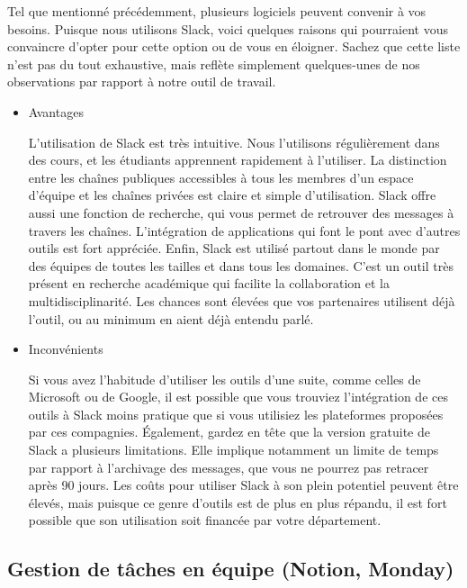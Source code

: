 \documentclass[
  letterpaper,
]{scrbook}
\begin{document}
Tel que mentionné précédemment, plusieurs logiciels peuvent convenir à
vos besoins. Puisque nous utilisons Slack, voici quelques raisons qui
pourraient vous convaincre d'opter pour cette option ou de vous en
éloigner. Sachez que cette liste n'est pas du tout exhaustive, mais
reflète simplement quelques-unes de nos observations par rapport à notre
outil de travail.

\begin{itemize}
\item
  Avantages

  L'utilisation de Slack est très intuitive. Nous l'utilisons
  régulièrement dans des cours, et les étudiants apprennent rapidement à
  l'utiliser. La distinction entre les chaînes publiques accessibles à
  tous les membres d'un espace d'équipe et les chaînes privées est
  claire et simple d'utilisation. Slack offre aussi une fonction de
  recherche, qui vous permet de retrouver des messages à travers les
  chaînes. L'intégration de applications qui font le pont avec d'autres
  outils est fort appréciée. Enfin, Slack est utilisé partout dans le
  monde par des équipes de toutes les tailles et dans tous les domaines.
  C'est un outil très présent en recherche académique qui facilite la
  collaboration et la multidisciplinarité. Les chances sont élevées que
  vos partenaires utilisent déjà l'outil, ou au minimum en aient déjà
  entendu parlé.
\item
  Inconvénients

  Si vous avez l'habitude d'utiliser les outils d'une suite, comme
  celles de Microsoft ou de Google, il est possible que vous trouviez
  l'intégration de ces outils à Slack moins pratique que si vous
  utilisiez les plateformes proposées par ces compagnies. Également,
  gardez en tête que la version gratuite de Slack a plusieurs
  limitations. Elle implique notamment un limite de temps par rapport à
  l'archivage des messages, que vous ne pourrez pas retracer après 90
  jours. Les coûts pour utiliser Slack à son plein potentiel peuvent
  être élevés, mais puisque ce genre d'outils est de plus en plus
  répandu, il est fort possible que son utilisation soit financée par
  votre département.
\end{itemize}

\hypertarget{gestion-de-tuxe2ches-en-uxe9quipe-notion-monday}{%
\subsection{Gestion de tâches en équipe (Notion,
Monday)}\label{gestion-de-tuxe2ches-en-uxe9quipe-notion-monday}}
\end{document}
